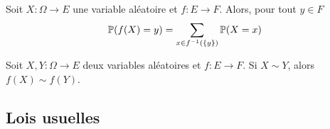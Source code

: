 \documentclass{magnolia}
\begin{document}


 

\begin{remarqueUnique}
\remarque Soit $X:\Omega\to E$ une variable aléatoire et $f:E\to F$. Alors, pour tout
$y\in F$
\[\mathbb{P}(f(X)=y)=\sum_{x\in f^{-1}(\left\{y\right\})} \mathbb{P}(X=x)\] 
  \end{remarqueUnique}

\begin{proposition}
Soit $X,Y:\Omega\to E$ deux variables aléatoires et $f:E\to F$. Si $X\sim Y$, alors
$f(X)\sim f(Y)$.
\end{proposition}



\subsection{Lois usuelles}


\end{document}
